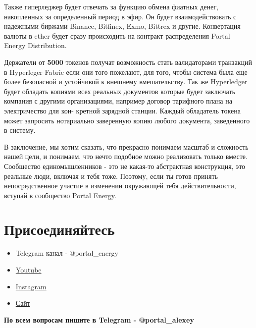 \documentclass[a4paper,12pt]{report}
\begin{document}
Также гиперледжер будет отвечать за функцию обмена фиатных денег, накопленных за определенный период в эфир. Он будет взаимодействовать с надежными биржами Binance, Bitfinex, Exmo, Bittrex и другие. Конвертация валюты в ether будет сразу происходить на контракт распределения Portal Energy Distribution.

Держатели от \textbf{5000} токенов получат возможность стать валидаторами транзакций в Hyperleger Fabric если они того пожелают, для того, чтобы система была еще более безопасной и устойчивой к внешнему вмешательству. Так же Hyperledger будет обладать копиями всех реальных документов которые будет заключать компания с другими организациями, например договор тарифного плана на электричество для кон-
кретной зарядной станции.
Каждый обладатель токена может запросить нотариально заверенную копию любого документа, заведенного в систему.


В заключение, мы хотим сказать, что прекрасно понимаем масштаб и сложность нашей цели, и понимаем, что нечто подобное можно реализовать только вместе. Сообщество единомышленников - это не какая-то абстрактная конструкция, это реальные люди, включая и тебя тоже. Поэтому, если ты готов принять непосредственное участие в изменении окружающей тебя действительности, вступай в сообщество Portal Energy.

\section{Присоединяйтесь}

\begin{itemize}
	\item Telegram канал - @portal\_energy
	\item \href{https://www.youtube.com/channel/UCtPxyCkz73i78F9HChlO61w}{Youtube}
	\item \href{https://www.instagram.com/petr_roadrunner/}{Instagram}
	\item \href{https://portalenergy.tech}{Сайт}
\end{itemize}

\textbf{По всем вопросам пишите в Telegram - @portal\_alexey}
\end{document}
